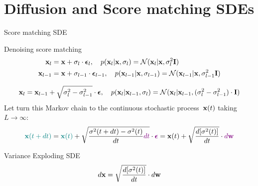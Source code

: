 \section{Diffusion and Score matching SDEs}
\begin{frame}{Score matching SDE}
	\begin{block}{Denoising score matching}
		\vspace{-0.7cm}
		\begin{align*}
			\mathbf{x}_l &= \mathbf{x} + \sigma_l \cdot \boldsymbol{\epsilon}_l, \quad p(\mathbf{x}_l | \mathbf{x}, \sigma_l) = \mathcal{N}(\mathbf{x}_l | \mathbf{x}, \sigma_l^2 \mathbf{I}) \\
			\mathbf{x}_{l-1} &= \mathbf{x} + \sigma_{l-1} \cdot \boldsymbol{\epsilon}_{l-1}, \quad p(\mathbf{x}_{l-1} | \mathbf{x}, \sigma_{l-1}) = \mathcal{N}(\mathbf{x}_{l-1} | \mathbf{x}, \sigma_{l-1}^2 \mathbf{I})
		\end{align*}
	\end{block}
	\vspace{-0.7cm}
	\[
		\mathbf{x}_l = \mathbf{x}_{l - 1} + \sqrt{\sigma^2_l - \sigma^2_{l-1}} \cdot \boldsymbol{\epsilon}, \quad p(\mathbf{x}_l | \mathbf{x}_{l-1}, \sigma_l) = \mathcal{N}(\mathbf{x}_l | \mathbf{x}_{l-1}, (\sigma_l^2 - \sigma_{l-1}^2) \cdot \mathbf{I})
	\]
	Let turn this Markov chain to the continuous stochastic process~$\mathbf{x}(t)$ taking $L \rightarrow \infty$:
	\[
		{\color{teal}\mathbf{x}(t + dt)} = {\color{teal}\mathbf{x}(t)} + \sqrt{\frac{\sigma^2(t + dt) - \sigma^2(t)}{dt} {\color{violet}dt}} \cdot {\color{violet}\boldsymbol{\epsilon}} = \mathbf{x}(t) + \sqrt{\frac{ d [\sigma^2(t)]}{dt}} \cdot {\color{violet}d \mathbf{w}}
	\]
	\vspace{-0.5cm}
	\begin{block}{Variance Exploding SDE}
		\vspace{-0.3cm}
		\[
			d \mathbf{x} = \sqrt{\frac{ d [\sigma^2(t)]}{dt}} \cdot d \mathbf{w}
		\]
	\end{block}
\end{frame}
